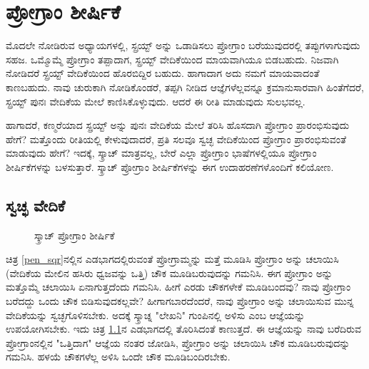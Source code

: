 \chapter{ಪ್ರೋಗ್ರಾಂ ಶೀರ್ಷಿಕೆ}
ಮೊದಲೇ ನೋಡಿರುವ ಅಧ್ಯಾಯಗಳಲ್ಲಿ,  ಸ್ಪ್ರಯ್ಟ್ ಅನ್ನು ಒಡಾಡಿಸಲು ಪ್ರೋಗ್ರಾಂ ಬರೆಯುವುದರಲ್ಲಿ ತಪ್ಪುಗಳಾಗುವುದು ಸಹಜ.  ಒಮ್ಮೊಮ್ಮೆ ಪ್ರೋಗ್ರಾಂ ತಪ್ಪಾದಾಗ,  ಸ್ಪ್ರಯ್ಟ್ ವೇದಿಕೆಯಿಂದ ಮಾಯವಾಗಿಯೂ ಬಿಡಬಹುದು.  ನಿಜವಾಗಿ ನೋಡಿದರೆ ಸ್ಪ್ರಯ್ಟ್ ವೇದಿಕೆಯಿಂದ ಹೊರಬಿದ್ದಿರ ಬಹುದು. ಹಾಗಾದಾಗ ಅದು ನಮಗೆ ಮಾಯವಾದಂತೆ ಕಾಣಬಹುದು.  ನಾವು ಚುರುಕಾಗಿ ನೋಡಿಕೊಂಡರೆ, ತಪ್ಪಗಿ ನೀಡಿದ ಆಜ್ಞೆಗಳೆಲ್ಲವನ್ನೂ ಕ್ರಮಾನುಸಾರವಾಗಿ ಹಿಂತೆಗೆದರೆ, ಸ್ಪ್ರಯ್ಟ್ ಪುನಃ ವೇದಿಕೆಯ ಮೇಲೆ ಕಾಣಿಸಿಕೊಳ್ಳುವುದು. ಆದರೆ ಈ ರೀತಿ ಮಾಡುವುದು ಸುಲಭವಲ್ಲ. 

ಹಾಗಾದರೆ, ಕಣ್ಮರೆಯಾದ ಸ್ಪ್ರಯ್ಟ್ ಅನ್ನು ಪುನಃ ವೇದಿಕೆಯ ಮೇಲೆ ತರಿಸಿ ಹೊಸದಾಗಿ ಪ್ರೋಗ್ರಾಂ ಪ್ರಾರಂಭಿಸುವುದು ಹೇಗೆ? ಮತ್ತೊಂದು ರೀತಿಯಲ್ಲಿ ಕೇಳುವುದಾದರೆ, ಪ್ರತಿ ಸಲವೂ ಸ್ವಚ್ಛ ವೇದಿಕೆಯಿಂದ ಪ್ರೋಗ್ರಾಂ ಪ್ರಾರಂಭಿಸುವಂತೆ ಮಾಡುವುದು ಹೇಗೆ? ಇದಕ್ಕೆ, ಸ್ಕ್ರಾಚ್ ಮಾತ್ರವಲ್ಲ, ಬೇರೆ ಎಲ್ಲಾ ಪ್ರೋಗ್ರಾಂ ಭಾಷೆಗಳಲ್ಲಿಯೂ ಪ್ರೋಗ್ರಾಂ ಶೀರ್ಷಿಕೆಗಳನ್ನು ಬಳಸುತ್ತಾರೆ.  ಸ್ಕ್ರಾಚ್ ಪ್ರೋಗ್ರಾಂ ಶೀರ್ಷಿಕೆಗಳನ್ನು ಈಗ ಉದಾಹರಣೆಗಳೊಂದಿಗೆ ಕಲಿಯೋಣ. 


\section{ಸ್ವಚ್ಛ ವೇದಿಕೆ}
\begin{figure}[h]
\begin{multicols}{3}
\begin{center}
\begin{Scratch}[1]
\end{Scratch}

\begin{Scratch}[1]
\end{Scratch}

\begin{Scratch}[1]
\end{Scratch}

\end{center}
\end{multicols}
\caption{ಸ್ಕ್ರಾಚ್ ಪ್ರೋಗ್ರಾಂ ಶೀರ್ಷಿಕೆ}
\label{hdr_init1}
\end{figure}

ಚಿತ್ರ \ref{pen_sqr}ನಲ್ಲಿನ ಎಡಭಾಗದಲ್ಲಿರುವಂತೆ ಪ್ರೋಗ್ರಾಮ್ಮನ್ನು ಮತ್ತೆ ಮೂಡಿಸಿ ಪ್ರೋಗ್ರಾಂ ಅನ್ನು  ಚಲಾಯಿಸಿ (ವೇದಿಕೆಯ ಮೇಲಿನ ಹಸಿರು ಧ್ವಜವನ್ನು ಒತ್ತಿ) ಚೌಕ ಮೂಡಿಬರುವುದನ್ನು ಗಮನಿಸಿ.  ಈಗ ಪ್ರೋಗ್ರಾಂ ಅನ್ನು  ಮತ್ತೊಮ್ಮೆ ಚಲಾಯಿಸಿ ಏನಾಗುತ್ತದೆಂದು ಗಮನಿಸಿ. ಹೀಗೆ ಎರಡು ಚೌಕಗಳೇಕೆ ಮೂಡಿಬಂದವು? ನಾವು ಪ್ರೋಗ್ರಾಂ  ಬರೆದದ್ದು ಒಂದು ಚೌಕ ಬಿಡಿಸುವುದಕಲ್ಲವೇ? ಹೀಗಾಗಬಾರದೆಂದರೆ, ನಾವು ಪ್ರೋಗ್ರಾಂ ಅನ್ನು  ಚಲಾಯಿಸುವ ಮುನ್ನ ವೇದಿಕೆಯನ್ನು ಸ್ವಚ್ಛಗೊಳಿಸಬೇಕು. ಅದಕ್ಕೆ ಸ್ಕ್ರಾಚ್ನ "ಲೇಖನಿ" ಗುಂಪಿನಲ್ಲಿ ಅಳಿಸು ಎಂಬ ಆಜ್ಞೆಯನ್ನು ಉಪಯೋಗಿಸಬೇಕು.  ಇದು ಚಿತ್ರ \ref{hdr_init1}ನ ಎಡಭಾಗದಲ್ಲಿ ತೊರಿಸಿದಂತೆ ಕಾಣುತ್ತದೆ. ಈ ಆಜ್ಞೆಯನ್ನು ನಾವು ಬರೆದಿರುವ ಪ್ರೋಗ್ರಾಂನಲ್ಲಿನ "ಒತ್ತಿದಾಗ" ಆಜ್ಞೆಯ ನಂತರ ಜೋಡಿಸಿ,  ಪ್ರೋಗ್ರಾಂ ಅನ್ನು  ಚಲಾಯಿಸಿ ಚೌಕ ಮೂಡಿಬರುವುದನ್ನು ಗಮನಿಸಿ.  ಹಳಯೆ ಚೌಕಗಳೆಲ್ಲ ಅಳಿಸಿ ಒಂದೇ ಚೌಕ ಮೂಡಿಬಂದಿರಬೇಕು. 

